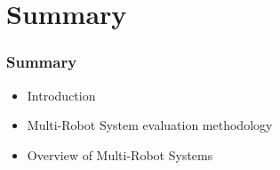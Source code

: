 \section{Summary}

\begin{frame}
	\frametitle{Summary}
	
	\begin{itemize}
		\item Introduction
		\vspace{0.2cm}
		\item Multi-Robot System evaluation methodology
		\vspace{0.2cm}
		\item Overview of Multi-Robot Systems
	\end{itemize}
\end{frame}
